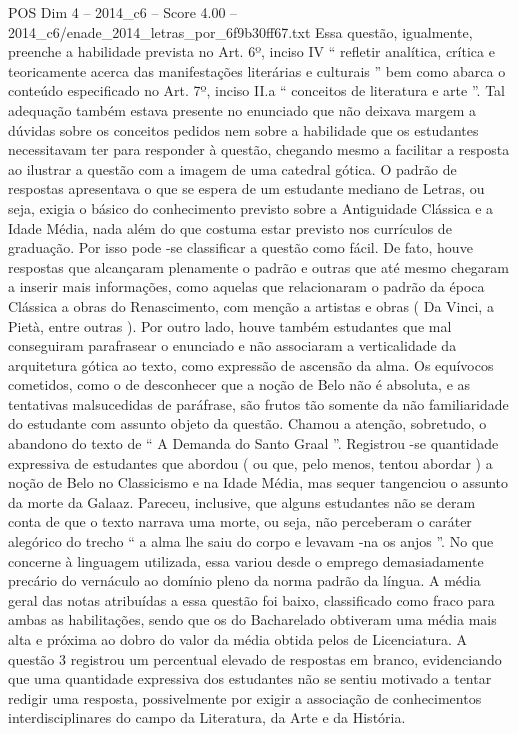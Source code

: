 \begin{textsample}{POS Dim 4 – 2014\_c6 – Score 4.00 – 2014\_c6/enade\_2014\_letras\_por\_6f9b30ff67.txt}
Essa questão, igualmente, preenche a habilidade prevista no Art. 6º, inciso IV “ refletir analítica, crítica e teoricamente acerca das manifestações literárias e culturais ” bem como abarca o conteúdo especificado no Art. 7º, inciso II.a “ conceitos de literatura e arte ”.
Tal adequação também estava presente no enunciado que não deixava margem a dúvidas sobre os conceitos pedidos nem sobre a habilidade que os estudantes necessitavam ter para responder à questão, chegando mesmo a facilitar a resposta ao ilustrar a questão com a imagem de uma catedral gótica.
O padrão de respostas apresentava o que se espera de um estudante mediano de Letras, ou seja, exigia o básico do conhecimento previsto sobre a Antiguidade Clássica e a Idade Média, nada além do que costuma estar previsto nos currículos de graduação.
Por isso pode -se classificar a questão como fácil.
De fato, houve respostas que alcançaram plenamente o padrão e outras que até mesmo chegaram a inserir mais informações, como aquelas que relacionaram o padrão da época Clássica a obras do Renascimento, com menção a artistas e obras ( Da Vinci, a Pietà, entre outras ).
Por outro lado, houve também estudantes que mal conseguiram parafrasear o enunciado e não associaram a verticalidade da arquitetura gótica ao texto, como expressão de ascensão da alma.
Os equívocos cometidos, como o de desconhecer que a noção de Belo não é absoluta, e as tentativas malsucedidas de paráfrase, são frutos tão somente da não familiaridade do estudante com assunto objeto da questão.
Chamou a atenção, sobretudo, o abandono do texto de “ A Demanda do Santo Graal ”.
Registrou -se quantidade expressiva de estudantes que abordou ( ou que, pelo menos, tentou abordar ) a noção de Belo no Classicismo e na Idade Média, mas sequer tangenciou o assunto da morte da Galaaz.
Pareceu, inclusive, que alguns estudantes não se deram conta de que o texto narrava uma morte, ou seja, não perceberam o caráter alegórico do trecho “ a alma lhe saiu do corpo e levavam -na os anjos ”.
No que concerne à linguagem utilizada, essa variou desde o emprego demasiadamente precário do vernáculo ao domínio pleno da norma padrão da língua.
A média geral das notas atribuídas a essa questão foi baixo, classificado como fraco para ambas as habilitações, sendo que os do Bacharelado obtiveram uma média mais alta e próxima ao dobro do valor da média obtida pelos de Licenciatura.
A questão 3 registrou um percentual elevado de respostas em branco, evidenciando que uma quantidade expressiva dos estudantes não se sentiu motivado a tentar redigir uma resposta, possivelmente por exigir a associação de conhecimentos interdisciplinares do campo da Literatura, da Arte e da História.

\end{textsample}
